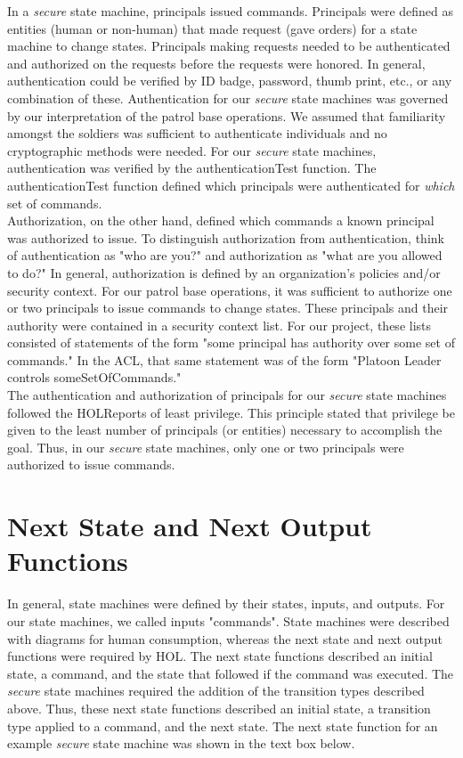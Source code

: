 In a \emph{secure} state machine, principals issued commands.  Principals were defined as entities (human or non-human) that made request (gave orders) for a state machine to change states.  Principals making requests needed to be authenticated and authorized on the requests before the requests were honored.  In general, authentication could be verified by ID badge, password, thumb print, etc., or any combination of these.  Authentication for our \emph{secure} state machines was governed by our interpretation of the patrol base operations.  We assumed that familiarity amongst the soldiers was sufficient to authenticate individuals and no cryptographic methods were needed.  For our \emph{secure} state machines, authentication was verified by the authenticationTest function. The authenticationTest function defined which principals were authenticated for \emph{which} set of commands.\\
  
Authorization, on the other hand, defined which commands a known principal was authorized to issue.  To distinguish authorization from authentication, think of authentication as "who are you?" and authorization as "what are you allowed to do?"  In general, authorization is defined by an organization's policies and/or security context. For our patrol base operations, it was sufficient to authorize one or two principals to issue commands to change states.  These principals and their authority were contained in a security context list.  For our project, these lists consisted of statements of the form "some principal has authority over some set of commands."  In the ACL, that same statement was of the form "Platoon Leader controls someSetOfCommands." \\
  
The authentication and authorization of principals for our \emph{secure} state machines followed the HOLReports of least privilege.  This principle stated that privilege be given to the least number of principals (or entities) necessary to accomplish the goal.   Thus, in our \emph{secure} state machines, only one or two principals were authorized to issue commands.   



\section{Next State and Next Output Functions}
\label{sec:next-state-next}



In general, state machines were defined by their states, inputs, and outputs.  For our state machines, we called inputs "commands".  State machines were described with diagrams for human consumption, whereas the next state and next output functions were required by HOL.  The next state functions described an initial state, a command, and the state that followed if the command was executed.  The \emph{secure} state machines required the addition of the transition types described above.  Thus, these next state functions described an initial state, a transition type applied to a command, and the next state.  The next state function for an example \emph{secure} state machine was shown in the text box below.\\
  
